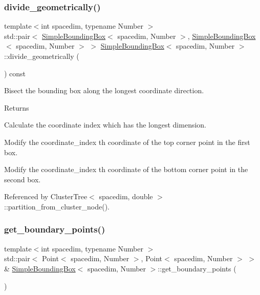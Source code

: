 \subsubsection{\texorpdfstring{divide\+\_\+geometrically()}{divide\_geometrically()}}
{\footnotesize\ttfamily template$<$int spacedim, typename Number $>$ \\
std\+::pair$<$ \hyperlink{classSimpleBoundingBox}{Simple\+Bounding\+Box}$<$ spacedim, Number $>$, \hyperlink{classSimpleBoundingBox}{Simple\+Bounding\+Box}$<$ spacedim, Number $>$ $>$ \hyperlink{classSimpleBoundingBox}{Simple\+Bounding\+Box}$<$ spacedim, Number $>$\+::divide\+\_\+geometrically (\begin{DoxyParamCaption}{ }\end{DoxyParamCaption}) const}

Bisect the bounding box along the longest coordinate direction. \begin{DoxyReturn}{Returns}

\end{DoxyReturn}
Calculate the coordinate index which has the longest dimension.

Modify the {\ttfamily coordinate\+\_\+index} \textquotesingle{}th coordinate of the top corner point in the first box.

Modify the {\ttfamily coordinate\+\_\+index} \textquotesingle{}th coordinate of the bottom corner point in the second box.

Referenced by Cluster\+Tree$<$ spacedim, double $>$\+::partition\+\_\+from\+\_\+cluster\+\_\+node().

\mbox{\label{classSimpleBoundingBox_a1cccc2f8ebc6b5f406738f04e145b598}} 
\subsubsection{\texorpdfstring{get\+\_\+boundary\+\_\+points()}{get\_boundary\_points()}\hspace{0.1cm}{\footnotesize\ttfamily [1/2]}}
{\footnotesize\ttfamily template$<$int spacedim, typename Number $>$ \\
std\+::pair$<$ Point$<$ spacedim, Number $>$, Point$<$ spacedim, Number $>$ $>$ \& \hyperlink{classSimpleBoundingBox}{Simple\+Bounding\+Box}$<$ spacedim, Number $>$\+::get\+\_\+boundary\+\_\+points (\begin{DoxyParamCaption}{ }\end{DoxyParamCaption})}

